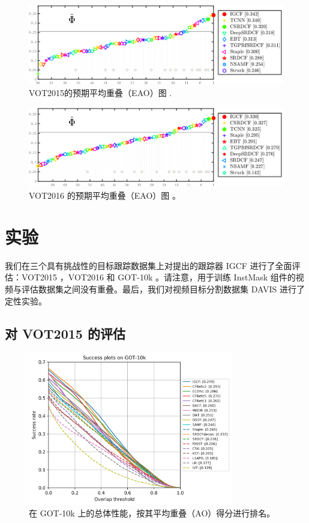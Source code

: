 \begin{figure}[t]
    \centering
    \includegraphics[width=1.0\textwidth]{Img/IGCF/vot/eao_rank_vot2015.png}
    \caption{VOT2015的预期平均重叠（EAO）图 \cite{Kristan2015TheVO}.}
    \label{fig:vot15}
\end{figure}

\begin{figure}[t]
    \centering
    \includegraphics[width=1.0\textwidth]{Img/IGCF/vot/eao_rank_vot2016.png}
    \caption{VOT2016 的预期平均重叠（EAO）图 \cite{Kristan2016TheVO}。}
    \label{fig:vot16}
\end{figure}

\section{实验}
我们在三个具有挑战性的目标跟踪数据集上对提出的跟踪器 IGCF 进行了全面评估：VOT2015 \cite{Kristan2015TheVO}，VOT2016 \cite{Kristan2016TheVO} 和 GOT-10k \cite{GOT-10k}。请注意，用于训练 InstMask 组件的视频与评估数据集之间没有重叠。最后，我们对视频目标分割数据集 DAVIS \cite{Perazzi2016} 进行了定性实验。
\subsection{对 VOT2015 的评估}

\begin{figure}[t]
    \centering
    \includegraphics[width=0.8\textwidth]{Img/IGCF/got10k/success_plot.png}
    \caption{在 GOT-10k \cite{GOT-10k}上的总体性能，按其平均重叠（AO）得分进行排名。}
    \label{fig:got10k}
\end{figure}

